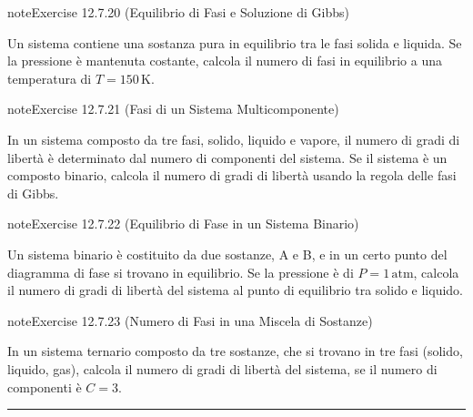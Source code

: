 \documentclass[letterpaper,10pt,italian]{jupyterBook}
\begin{document}
\begin{sphinxadmonition}{note}{Exercise 12.7.20 (Equilibrio di Fasi e Soluzione di Gibbs)}



\sphinxAtStartPar
Un sistema contiene una sostanza pura in equilibrio tra le fasi solida e liquida. Se la pressione è mantenuta costante, calcola il numero di fasi in equilibrio a una temperatura di \(T = 150 \, \text{K}\).
\end{sphinxadmonition}
 \label{exercise:ch/thermodynamics/principles-problems-exercise-20}

\begin{sphinxadmonition}{note}{Exercise 12.7.21 (Fasi di un Sistema Multicomponente)}



\sphinxAtStartPar
In un sistema composto da tre fasi, solido, liquido e vapore, il numero di gradi di libertà è determinato dal numero di componenti del sistema. Se il sistema è un composto binario, calcola il numero di gradi di libertà usando la regola delle fasi di Gibbs.
\end{sphinxadmonition}
 \label{exercise:ch/thermodynamics/principles-problems-exercise-21}

\begin{sphinxadmonition}{note}{Exercise 12.7.22 (Equilibrio di Fase in un Sistema Binario)}



\sphinxAtStartPar
Un sistema binario è costituito da due sostanze, A e B, e in un certo punto del diagramma di fase si trovano in equilibrio. Se la pressione è di \(P = 1 \, \text{atm}\), calcola il numero di gradi di libertà del sistema al punto di equilibrio tra solido e liquido.
\end{sphinxadmonition}
 \label{exercise:ch/thermodynamics/principles-problems-exercise-22}

\begin{sphinxadmonition}{note}{Exercise 12.7.23 (Numero di Fasi in una Miscela di Sostanze)}



\sphinxAtStartPar
In un sistema ternario composto da tre sostanze, che si trovano in tre fasi (solido, liquido, gas), calcola il numero di gradi di libertà del sistema, se il numero di componenti è \(C = 3\).
\end{sphinxadmonition}


\bigskip\hrule\bigskip
\end{document}
